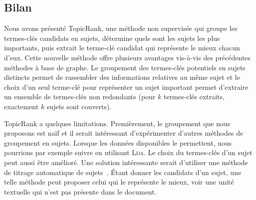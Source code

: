 
      \subsection{Bilan}
      \label{subsec:main:domain_independent_keyphrase_extraction-unsupervised_automatic_keyphrase_extraction-bilan}
        Nous avons présenté TopicRank, une méthode non supervisée qui groupe les
        termes-clés candidats en sujets, détermine quels sont les sujets les
        plus importants, puis extrait le terme-clé candidat qui représente le
        mieux chacun d'eux. Cette nouvelle méthode
        offre plusieurs avantages vis-à-vis des précédentes méthodes à base de
        graphe. Le groupement des termes-clés potentiels en sujets distincts
        permet de rassembler des informations relatives au même sujet et le
        choix d'un seul terme-clé pour représenter un sujet important permet
        d'extraire un ensemble de termes-clés non redondants (pour $k$
        termes-clés extraits, exactement $k$ sujets sont couverts).

        TopicRank a quelques limitations. Premièrement, le groupement que nous
        proposons est \og{}naïf\fg{} et il serait intéressant d'expérimenter
        d'autres méthodes de groupement en sujets. Lorsque les données
        disponibles le permettent, nous pourrions par exemple suivre
         en
        utilisant \textsc{Lda}. Le choix du termes-clés d'un sujet peut aussi
        être amélioré. Une solution intéressante serait d'utiliser une méthode
        de titrage automatique de sujets~\cite{lau2011topiclabeling}. Étant
        donner les candidats d'un sujet, une telle méthode peut proposer celui
        qui le représente le mieux, voir une unité textuelle qui n'est pas
        présente dans le document.

